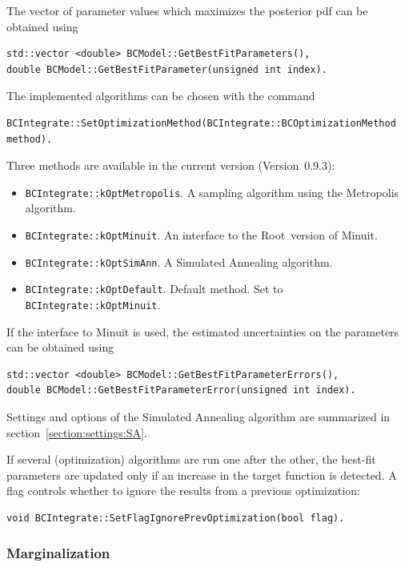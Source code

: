 \documentclass[11pt, a4paper]{article}
\newcommand{\Root}{{\sc Root}}
\newcommand{\versionno}{0.9.3}
\newcommand{\Version}{Version~\versionno}
\begin{document}
The vector of parameter values which maximizes the posterior pdf can
be obtained using
%
\begin{verbatim}
std::vector <double> BCModel::GetBestFitParameters(),
double BCModel::GetBestFitParameter(unsigned int index).
\end{verbatim}
%
The implemented algorithms can be chosen with the command
%
\begin{verbatim}
BCIntegrate::SetOptimizationMethod(BCIntegrate::BCOptimizationMethod method).
\end{verbatim}
%
Three methods are available in the current version (\Version):
%
\begin{itemize}
\item \verb|BCIntegrate::kOptMetropolis|. A sampling algorithm using the
  Metropolis algorithm.
\item \verb|BCIntegrate::kOptMinuit|. An interface to the \Root\ version
  of Minuit.
\item \verb|BCIntegrate::kOptSimAnn|. A Simulated Annealing algorithm.
\item \verb|BCIntegrate::kOptDefault|. Default method. Set to
  \verb|BCIntegrate::kOptMinuit|.
\end{itemize}
%
If the interface to Minuit is used, the estimated uncertainties on the
parameters can be obtained using
%
\begin{verbatim}
std::vector <double> BCModel::GetBestFitParameterErrors(),
double BCModel::GetBestFitParameterError(unsigned int index).
\end{verbatim}
%
Settings and options of the Simulated Annealing algorithm are
summarized in section~\ref{section:settings:SA}.

If several (optimization) algorithms are run one after the other, the
best-fit parameters are updated only if an increase in the target
function is detected. A flag controls whether to ignore the results
from a previous optimization:
%
\begin{verbatim}
void BCIntegrate::SetFlagIgnorePrevOptimization(bool flag).
\end{verbatim}


\subsubsection{Marginalization}
\label{subsubsection:marginalization}
\end{document}
